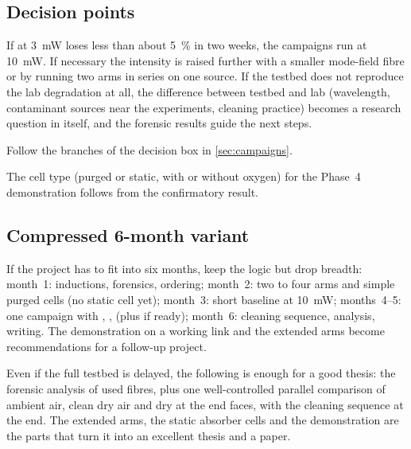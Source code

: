 \subsection{Decision points}
\begin{description}[style=nextline,leftmargin=1.2em,itemsep=3pt]
  \item[D1, end of WP4: is the degradation fast enough to study?] If  at \SI{3}{mW} loses less
        than about \SI{5}{\percent} in two weeks, the campaigns run at \SI{10}{mW}. If necessary the
        intensity is raised further with a smaller mode-field fibre or by running two arms in series on
        one source. If the testbed does not reproduce the lab degradation at all, the difference
        between testbed and lab (wavelength, contaminant sources near the experiments, cleaning
        practice) becomes a research question in itself, and the forensic results guide the next steps.
  \item[D2, end of WP5: which mechanism?] Follow the branches of the decision box in \cref{sec:campaigns}.
  \item[D3, end of WP6: what is deployed?] The cell type (purged or static, with or without oxygen) for
        the Phase~4 demonstration follows from the confirmatory result.
\end{description}

\subsection{Compressed 6-month variant}
If the project has to fit into six months, keep the logic but drop breadth:
month~1: inductions, forensics, ordering; month~2: two to four arms and simple purged cells
(no static cell yet); month~3: short baseline at \SI{10}{mW}; months~4--5: one campaign with ,
,  (plus  if ready); month~6: cleaning sequence, analysis, writing. The
demonstration on a working link and the extended arms become recommendations for a follow-up project.

\begin{keybox}
Even if the full testbed is delayed, the following is enough for a good thesis: the forensic analysis
of used fibres, plus one well-controlled parallel comparison of ambient air, clean dry air and dry
\Ntwo{} at the end faces, with the cleaning sequence at the end. The extended arms, the static absorber
cells and the demonstration are the parts that turn it into an excellent thesis and a paper.
\end{keybox}
